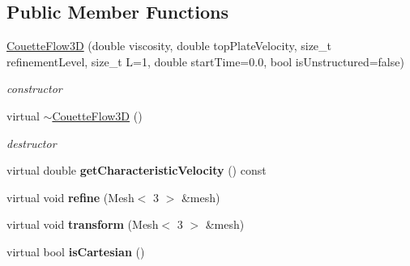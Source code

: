 \subsection*{Public Member Functions}
\begin{DoxyCompactItemize}
\item 
\hyperlink{classnatrium_1_1CouetteFlow3D_acf083268f4190ffe62b01f3dfc77d407}{CouetteFlow3D} (double viscosity, double topPlateVelocity, size\_\-t refinementLevel, size\_\-t L=1, double startTime=0.0, bool isUnstructured=false)
\begin{DoxyCompactList}\small\item\em constructor \item\end{DoxyCompactList}\item 
\hypertarget{classnatrium_1_1CouetteFlow3D_a2d1b9db247ba3e51ed092dab3637a657}{
virtual \hyperlink{classnatrium_1_1CouetteFlow3D_a2d1b9db247ba3e51ed092dab3637a657}{$\sim$CouetteFlow3D} ()}
\label{classnatrium_1_1CouetteFlow3D_a2d1b9db247ba3e51ed092dab3637a657}

\begin{DoxyCompactList}\small\item\em destructor \item\end{DoxyCompactList}\item 
\hypertarget{classnatrium_1_1CouetteFlow3D_a38cc986a0f45a5ec7ef56fefc9e342df}{
virtual double {\bfseries getCharacteristicVelocity} () const }
\label{classnatrium_1_1CouetteFlow3D_a38cc986a0f45a5ec7ef56fefc9e342df}

\item 
\hypertarget{classnatrium_1_1CouetteFlow3D_a593a4537da4996cd7db1ff8184e7cde2}{
virtual void {\bfseries refine} (Mesh$<$ 3 $>$ \&mesh)}
\label{classnatrium_1_1CouetteFlow3D_a593a4537da4996cd7db1ff8184e7cde2}

\item 
\hypertarget{classnatrium_1_1CouetteFlow3D_afb788d67404db5a8949f49ca49d0b6e1}{
virtual void {\bfseries transform} (Mesh$<$ 3 $>$ \&mesh)}
\label{classnatrium_1_1CouetteFlow3D_afb788d67404db5a8949f49ca49d0b6e1}

\item 
\hypertarget{classnatrium_1_1CouetteFlow3D_adc24248b0c562fc16adf3f5d777cec9e}{
virtual bool {\bfseries isCartesian} ()}
\label{classnatrium_1_1CouetteFlow3D_adc24248b0c562fc16adf3f5d777cec9e}

\end{DoxyCompactItemize}


